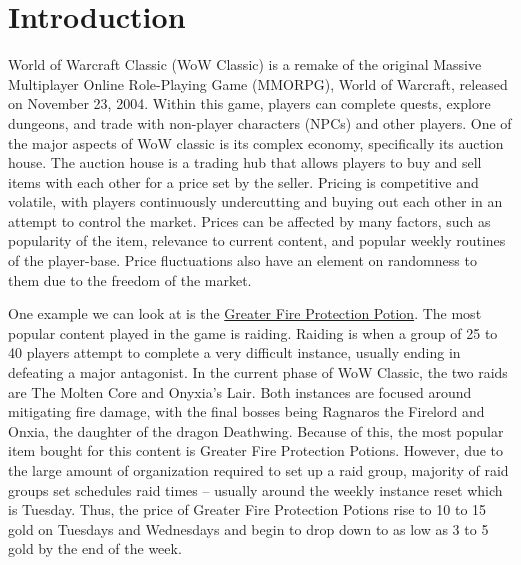 \documentclass[sigconf]{acmart}
\begin{document}

%

%
\maketitle

\section{Introduction}
World of Warcraft Classic (WoW Classic) is a remake of the original Massive Multiplayer Online Role-Playing Game (MMORPG), World of Warcraft, released on November 23, 2004. Within this game, players can complete quests, explore dungeons, and trade with non-player characters (NPCs) and other players. One of the major aspects of WoW classic is its complex economy, specifically its auction house. The auction house is a trading hub that allows players to buy and sell items with each other for a price set by the seller. Pricing is competitive and volatile, with players continuously undercutting and buying out each other in an attempt to control the market. Prices can be affected by many factors, such as popularity of the item, relevance to current content, and popular weekly routines of the player-base. Price fluctuations also have an element on randomness to them due to the freedom of the market.

One example we can look at is the \href{https://classic.wowhead.com/item=13457/greater-fire-protection-potion}{Greater Fire Protection Potion}. The most popular content played in the game is raiding. Raiding is when a group of 25 to 40 players attempt to complete a very difficult instance, usually ending in defeating a major antagonist. In the current phase of WoW Classic, the two raids are The Molten Core and Onyxia’s Lair. Both instances are focused around mitigating fire damage, with the final bosses being Ragnaros the Firelord and Onxia, the daughter of the dragon Deathwing. Because of this, the most popular item bought for this content is Greater Fire Protection Potions. However, due to the large amount of organization required to set up a raid group, majority of raid groups set schedules raid times – usually around the weekly instance reset which is Tuesday. Thus, the price of Greater Fire Protection Potions rise to 10 to 15 gold on Tuesdays and Wednesdays and begin to drop down to as low as 3 to 5 gold by the end of the week.
\end{document}
